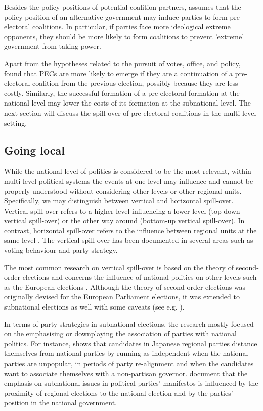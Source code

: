 \documentclass[fignum,12pt,titlepage]{article}
\begin{document}
Besides the policy positions of potential coalition partners, \textcite{golder2006} assumes that the policy position of an alternative government may induce parties to form pre-electoral coalitions. In particular, if parties face more ideological extreme opponents, they should be more likely to form coalitions to prevent 'extreme' government from taking power.

Apart from the hypotheses related to the pursuit of votes, office, and policy, \textcite{ibenskas2016} found that PECs are more likely to emerge if they are a continuation of a pre-electoral coalition from the previous election, possibly because they are less costly. 
Similarly, the successful formation of a pre-electoral formation at the national level may lower the costs of its formation at the subnational level. The next section will discuss the spill-over of pre-electoral coalitions in the multi-level setting.

\subsection{Going local}

While the national level of politics is considered to be the most relevant, within multi-level political systems the events at one level may influence and cannot be properly understood without considering other levels or other regional units. Specifically, we may distinguish between vertical and horizontal spill-over. Vertical spill-over refers to a higher level influencing a lower level (top-down vertical spill-over) or the other way around (bottom-up vertical spill-over). In contrast, horizontal spill-over refers to the influence between regional units at the same level \parencite{schakel2021}. The vertical spill-over has been documented in several areas such as voting behaviour and party strategy. 

The most common research on vertical spill-over is based on the theory of second-order elections and concerns the influence of national politics on other levels such as the European elections \parencite{reif1980}. Although the theory of second-order elections was originally devised for the European Parliament elections, it was extended to subnational elections as well with some caveats (see e.g. \cite{heath1999, schakel2013}). 

In terms of party strategies in subnational elections, the research mostly focused on the emphasising or downplaying the association of parties with national politics. For instance, \textcite{hijino2021} shows that candidates in Japanese regional parties distance themselves from national parties by running as independent when the national parties are unpopular, in periods of party re-alignment and when the candidates want to associate themselves with a non-partisan governor. \textcite{gross2022} document that the emphasis on subnational issues in political parties' manifestos is influenced by the proximity of regional elections to the national election and by the parties' position in the national government.
\end{document}
